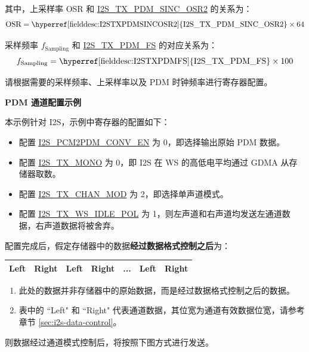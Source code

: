 \documentclass[main\_\_CN.tex]{subfiles}
\begin{document}
\begin{itemize}
    其中，上采样率 OSR 和 \hyperref[fielddesc:I2STXPDMSINCOSR2]{I2S\_TX\_PDM\_SINC\_OSR2} 的关系为：
    $${\textrm{OSR}} = {\textrm{\hyperref[fielddesc:I2STXPDMSINCOSR2]{I2S\_TX\_PDM\_SINC\_OSR2}}} \times {\textrm{64}}$$
    
    采样频率 $f_{\textrm{Sampling}}$ 和 \hyperref[fielddesc:I2STXPDMFS]{I2S\_TX\_PDM\_FS} 的对应关系为：
    $$f_{\textrm{Sampling}} = {\textrm{\hyperref[fielddesc:I2STXPDMFS]{I2S\_TX\_PDM\_FS}}} \times {\textrm{100}}$$
    
    请根据需要的采样频率、上采样率以及 PDM 时钟频率进行寄存器配置。
\end{itemize}


\textbf{PDM 通道配置示例}

本示例针对 I2S，示例中寄存器的配置如下：

\begin{itemize}
    \item 配置 \hyperref[fielddesc:I2SPCM2PDMCONVEN]{I2S\_PCM2PDM\_CONV\_EN} 为 0，即选择输出原始 PDM 数据。
    \item 配置 \hyperref[fielddesc:I2STXMONO]{I2S\_TX\_MONO} 为 0，即 I2S 在 WS 的高低电平均通过 GDMA 从存储器取数。
    \item 配置 \hyperref[fielddesc:I2STXCHANMOD]{I2S\_TX\_CHAN\_MOD} 为 2，即选择单声道模式。
    \item 配置 \hyperref[fielddesc:I2STXWSIDLEPOL]{I2S\_TX\_WS\_IDLE\_POL} 为 1，则左声道和右声道均发送左通道数据，右声道数据将被舍弃。
\end{itemize}

配置完成后，假定存储器中的数据\textbf{经过数据格式控制之后}为：

\begin{table}[H]
    \centering
    \begin{tabular}{|c|c|c|c|c|c|c|}
    \hline
    Left & Right & Left & Right & ... & Left & Right \\ \hline
    \end{tabular}
\end{table}
\vspace{-0.5em}
\begin{tiplisting}
\vspace{-2em}
\begin{enumerate}
    \item 此处的数据并非存储器中的原始数据，而是经过数据格式控制之后的数据。
    \item 表中的 ``Left" 和 ``Right" 代表通道数据，其位宽为通道有效数据位宽，请参考章节 \ref{sec:i2s-data-control}。
\end{enumerate}
\end{tiplisting}
\vspace{-1em}
则数据经过通道模式控制后，将按照下图方式进行发送。
\end{document}
